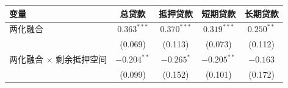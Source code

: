 {\scriptsize
\begin{center}
\begin{tabular}{lcccc}
  \toprule
  变量 & 总贷款 & 抵押贷款 & 短期贷款 & 长期贷款 \\
  \midrule
  两化融合 & $0.363^{***}$ & $0.370^{***}$ & $0.319^{***}$ & $0.250^{**}$ \\
           & (0.069) & (0.113) & (0.073) & (0.112) \\
  两化融合 $\times$ 剩余抵押空间 & $-0.204^{**}$ & $-0.265^{*}$ & $-0.205^{**}$ & $-0.163$ \\
                                      & (0.099) & (0.152) & (0.101) & (0.172) \\
  \bottomrule
\end{tabular}
\end{center}
}
